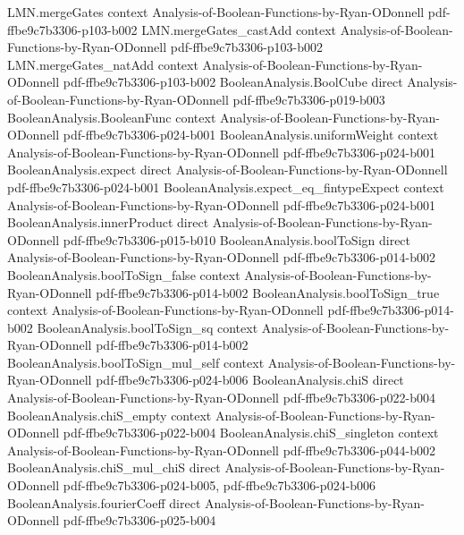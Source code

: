 \begin{lemma}
\proofstep
  {LMN.mergeGates}
  {context}
  {Analysis-of-Boolean-Functions-by-Ryan-ODonnell}
  {pdf-ffbe9c7b3306-p103-b002}
\proofstep
  {LMN.mergeGates_castAdd}
  {context}
  {Analysis-of-Boolean-Functions-by-Ryan-ODonnell}
  {pdf-ffbe9c7b3306-p103-b002}
\proofstep
  {LMN.mergeGates_natAdd}
  {context}
  {Analysis-of-Boolean-Functions-by-Ryan-ODonnell}
  {pdf-ffbe9c7b3306-p103-b002}
\proofstep
  {BooleanAnalysis.BoolCube}
  {direct}
  {Analysis-of-Boolean-Functions-by-Ryan-ODonnell}
  {pdf-ffbe9c7b3306-p019-b003}
\proofstep
  {BooleanAnalysis.BooleanFunc}
  {context}
  {Analysis-of-Boolean-Functions-by-Ryan-ODonnell}
  {pdf-ffbe9c7b3306-p024-b001}
\proofstep
  {BooleanAnalysis.uniformWeight}
  {context}
  {Analysis-of-Boolean-Functions-by-Ryan-ODonnell}
  {pdf-ffbe9c7b3306-p024-b001}
\proofstep
  {BooleanAnalysis.expect}
  {direct}
  {Analysis-of-Boolean-Functions-by-Ryan-ODonnell}
  {pdf-ffbe9c7b3306-p024-b001}
\proofstep
  {BooleanAnalysis.expect_eq_fintypeExpect}
  {context}
  {Analysis-of-Boolean-Functions-by-Ryan-ODonnell}
  {pdf-ffbe9c7b3306-p024-b001}
\proofstep
  {BooleanAnalysis.innerProduct}
  {direct}
  {Analysis-of-Boolean-Functions-by-Ryan-ODonnell}
  {pdf-ffbe9c7b3306-p015-b010}
\proofstep
  {BooleanAnalysis.boolToSign}
  {direct}
  {Analysis-of-Boolean-Functions-by-Ryan-ODonnell}
  {pdf-ffbe9c7b3306-p014-b002}
\proofstep
  {BooleanAnalysis.boolToSign_false}
  {context}
  {Analysis-of-Boolean-Functions-by-Ryan-ODonnell}
  {pdf-ffbe9c7b3306-p014-b002}
\proofstep
  {BooleanAnalysis.boolToSign_true}
  {context}
  {Analysis-of-Boolean-Functions-by-Ryan-ODonnell}
  {pdf-ffbe9c7b3306-p014-b002}
\proofstep
  {BooleanAnalysis.boolToSign_sq}
  {context}
  {Analysis-of-Boolean-Functions-by-Ryan-ODonnell}
  {pdf-ffbe9c7b3306-p014-b002}
\proofstep
  {BooleanAnalysis.boolToSign_mul_self}
  {context}
  {Analysis-of-Boolean-Functions-by-Ryan-ODonnell}
  {pdf-ffbe9c7b3306-p024-b006}
\proofstep
  {BooleanAnalysis.chiS}
  {direct}
  {Analysis-of-Boolean-Functions-by-Ryan-ODonnell}
  {pdf-ffbe9c7b3306-p022-b004}
\proofstep
  {BooleanAnalysis.chiS_empty}
  {context}
  {Analysis-of-Boolean-Functions-by-Ryan-ODonnell}
  {pdf-ffbe9c7b3306-p022-b004}
\proofstep
  {BooleanAnalysis.chiS_singleton}
  {context}
  {Analysis-of-Boolean-Functions-by-Ryan-ODonnell}
  {pdf-ffbe9c7b3306-p044-b002}
\proofstep
  {BooleanAnalysis.chiS_mul_chiS}
  {direct}
  {Analysis-of-Boolean-Functions-by-Ryan-ODonnell}
  {pdf-ffbe9c7b3306-p024-b005,
    pdf-ffbe9c7b3306-p024-b006}
\proofstep
  {BooleanAnalysis.fourierCoeff}
  {direct}
  {Analysis-of-Boolean-Functions-by-Ryan-ODonnell}
  {pdf-ffbe9c7b3306-p025-b004}

\end{lemma}
